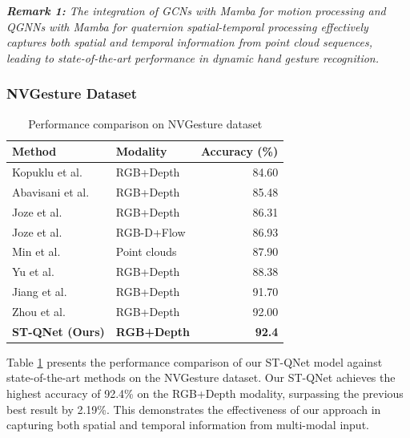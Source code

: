 \documentclass[journal]{IEEEtran}
\theoremstyle{plain}
\begin{document}
\textit{\textbf{Remark 1:} The integration of GCNs with Mamba for motion processing and QGNNs with Mamba for quaternion spatial-temporal processing effectively captures both spatial and temporal information from point cloud sequences, leading to state-of-the-art performance in dynamic hand gesture recognition.}
\subsubsection{NVGesture Dataset}
\begin{table}[ht]
\centering
\caption{Performance comparison on NVGesture dataset}
\label{tab:nvgesture-comparison}
\small
\begin{tabular}{@{}p{3.2cm}p{1.8cm}r@{}}
\hline
\textbf{Method} & \textbf{Modality} & \textbf{Accuracy (\%)} \\
\hline
Kopuklu et al. \cite{9320419} & RGB+Depth & 84.60 \\
Abavisani et al. \cite{abavisani2019improvingperformanceunimodaldynamic} & RGB+Depth & 85.48 \\
Joze et al. \cite{joze2020mmtmmultimodaltransfermodule} & RGB+Depth & 86.31 \\
Joze et al. \cite{joze2020mmtmmultimodaltransfermodule} & RGB-D+Flow & 86.93 \\
Min et al. \cite{min_CVPR2020_PointLSTM} & Point clouds & 87.90 \\
Yu et al. \cite{Yu_2021} & RGB+Depth & 88.38 \\
Jiang et al. \cite{9879509} & RGB+Depth & 91.70 \\
Zhou et al. \cite{10122710} & RGB+Depth & 92.00 \\
\hline
\textbf{ST-QNet (Ours)} & \textbf{RGB+Depth} & \textbf{92.4} \\
\hline
\end{tabular}
\end{table}
Table \ref{tab:nvgesture-comparison} presents the performance comparison of our ST-QNet model against state-of-the-art methods on the NVGesture dataset.
Our ST-QNet achieves the highest accuracy of 92.4\% on the RGB+Depth modality, surpassing the previous best result by 2.19\%. This demonstrates the effectiveness of our approach in capturing both spatial and temporal information from multi-modal input.
\end{document}

